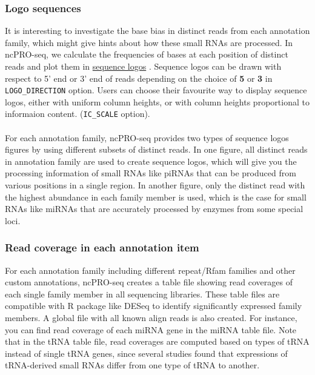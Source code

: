 \documentclass[12pt]{article}
\def \ncpip{ncPRO-seq}
\begin{document}
\subsubsection{Logo sequences}
\label{subsubsection:logo}
It is interesting to investigate the base bias in distinct reads from each annotation family, which might give hints about how these small RNAs are processed. In \ncpip{}, we calculate the frequencies of bases at each position of distinct reads and plot them in \href{http://www.bioconductor.org/packages/2.2/bioc/html/seqLogo.html}{ sequence logos} \cite{OliverseqLogo}. Sequence logos can be drawn with respect to 5' end or 3' end of reads depending on the choice of \textbf{5} or \textbf{3} in \verb+LOGO_DIRECTION+ option. Users can choose their favourite way to display sequence logos, either with uniform column heights, or with column heights proportional to informaion content. (\verb+IC_SCALE+ option). \\\\
For each annotation family, \ncpip{} provides two types of sequence logos figures by using different subsets of distinct reads. In one figure, all distinct reads in annotation family are used to create sequence logos, which will give you the processing information of small RNAs like piRNAs that can be produced from various positions in a single region. In another figure, only the distinct read with the highest abundance in each family member is used, which is the case for small RNAs like miRNAs that are accurately processed by enzymes from some special loci. 

\subsubsection{Read coverage in each annotation item}
For each annotation family including different repeat/Rfam families and other custom annotations, \ncpip{} creates a table file showing read coverages of each single family member in all sequencing libraries. These table files are compatible with R package like DESeq \cite{Simon2010} to identify significantly expressed family members. A global file with all known align reads is also created. For instance, you can find read coverage of each miRNA gene in the miRNA table file. Note that in the tRNA table file, read coverages are computed based on types of tRNA instead of single tRNA genes, since several studies found that expressions of tRNA-derived small RNAs differ from one type of tRNA to another.
\end{document}
